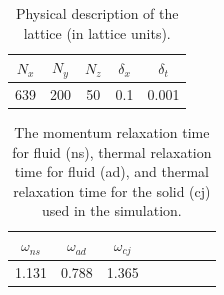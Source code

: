 \begin {table}[h] %
\caption{Physical description of the lattice (in lattice units).}
\label{tab:lbm-parameters} \centering %
\begin {tabular}{ ccccc }
\toprule %
$N_x$   &   $N_y$  &   $N_z$    &   $\delta_x$   & $\delta_t$    \\\toprule
639      &   200     &   50     &    0.1         &  0.001        \\\bottomrule
\end{tabular}
\end{table}

\begin {table}[h] %
\caption{The momentum relaxation time for fluid (ns), thermal relaxation time for fluid (ad), and thermal relaxation time for the solid (cj) used in the simulation.}
\label{tab:lbm-relaxations} \centering %
\begin {tabular}{ cccccccc }
\toprule %
$\omega_{ns}$ &  $\omega_{ad}$  &   $\omega_{cj}$     \\\toprule
1.131      &  0.788       &   1.365          \\\bottomrule
\end{tabular}
\end{table}




